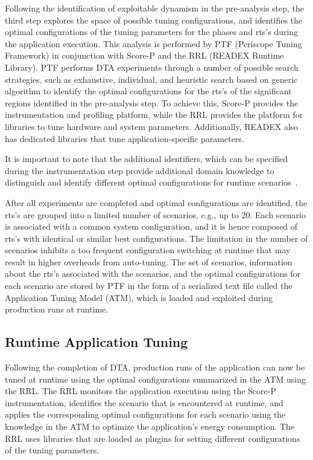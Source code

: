 Following the identification of exploitable dynamism in the pre-analysis step, the third step explores the space of possible tuning configurations, and identifies the optimal configurations of the tuning parameters for the phases and rts's during the application execution. This analysis is performed by PTF (Periscope Tuning Framework) in conjunction with Score-P and the RRL (READEX Runtime Library). PTF performs DTA experiments through a number of possible search strategies, such as exhaustive, individual, and heuristic search based on generic algorithm to identify the optimal configurations for the rts's of the significant regions identified in the pre-analysis step. To achieve this, Score-P provides the instrumentation and profiling platform, while the RRL provides the platform for libraries to tune hardware and system parameters. Additionally, READEX also has dedicated libraries that tune application-specific parameters.

It is important to note that the additional identifiers, which can be specified during the instrumentation step provide additional domain knowledge to distinguish and identify different optimal configurations for runtime scenarios~\cite{PACO17}.

After all experiments are completed and optimal configurations are identified, the rts's are grouped into a limited number of scenarios, e.g., up to 20. Each scenario is associated with a common system configuration, and it is hence composed of rts's with identical or similar best configurations. The limitation in the number of scenarios inhibits a too frequent configuration switching at runtime that may result in higher overheads from auto-tuning. The set of scenarios, information about the rts's associated with the scenarios, and the optimal configurations for each scenario are stored by PTF in the form of a serialized text file called the Application Tuning Model (ATM), which is loaded and exploited during production runs at runtime.

\subsection{Runtime Application Tuning}
\label{sec:runtime_tuning}

Following the completion of DTA, production runs of the application can now be tuned at runtime using the optimal configurations summarized in the ATM using the RRL. The RRL monitors the application execution using the Score-P instrumentation, identifies the scenario that is encountered at runtime, and applies the corresponding optimal configurations for each scenario using the knowledge in the ATM to optimize the application's energy consumption. The RRL uses libraries that are loaded as plugins for setting different configurations of the tuning parameters.

